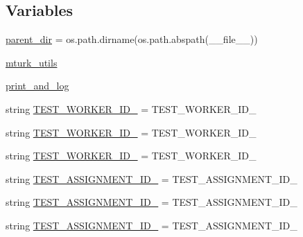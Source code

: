 \subsection*{Variables}
\begin{DoxyCompactItemize}
\item 
\hyperlink{namespaceparlai_1_1mturk_1_1core_1_1dev_1_1test_1_1test__mturk__manager_acd13432cc030998059ef8a169c9fc0d9}{parent\+\_\+dir} = os.\+path.\+dirname(os.\+path.\+abspath(\+\_\+\+\_\+file\+\_\+\+\_\+))
\item 
\hyperlink{namespaceparlai_1_1mturk_1_1core_1_1dev_1_1test_1_1test__mturk__manager_a83971cb67594cba9218bfcffd9ed69f2}{mturk\+\_\+utils}
\item 
\hyperlink{namespaceparlai_1_1mturk_1_1core_1_1dev_1_1test_1_1test__mturk__manager_a8fe3b38bbc8a32c617e98927800a3f06}{print\+\_\+and\+\_\+log}
\item 
string \hyperlink{namespaceparlai_1_1mturk_1_1core_1_1dev_1_1test_1_1test__mturk__manager_a691df1ad716a5363152b26594780d382}{T\+E\+S\+T\+\_\+\+W\+O\+R\+K\+E\+R\+\_\+\+I\+D\+\_} = \textquotesingle{}T\+E\+S\+T\+\_\+\+W\+O\+R\+K\+E\+R\+\_\+\+I\+D\+\_\textquotesingle{}
\item 
string \hyperlink{namespaceparlai_1_1mturk_1_1core_1_1dev_1_1test_1_1test__mturk__manager_a935e89e9de5861e62740e32485699dc6}{T\+E\+S\+T\+\_\+\+W\+O\+R\+K\+E\+R\+\_\+\+I\+D\+\_} = \textquotesingle{}T\+E\+S\+T\+\_\+\+W\+O\+R\+K\+E\+R\+\_\+\+I\+D\+\_\textquotesingle{}
\item 
string \hyperlink{namespaceparlai_1_1mturk_1_1core_1_1dev_1_1test_1_1test__mturk__manager_a5b52d172671ef0039980b281d73647af}{T\+E\+S\+T\+\_\+\+W\+O\+R\+K\+E\+R\+\_\+\+I\+D\+\_} = \textquotesingle{}T\+E\+S\+T\+\_\+\+W\+O\+R\+K\+E\+R\+\_\+\+I\+D\+\_\textquotesingle{}
\item 
string \hyperlink{namespaceparlai_1_1mturk_1_1core_1_1dev_1_1test_1_1test__mturk__manager_a770963a8b8dbeddf1c52f2f5a79c5294}{T\+E\+S\+T\+\_\+\+A\+S\+S\+I\+G\+N\+M\+E\+N\+T\+\_\+\+I\+D\+\_} = \textquotesingle{}T\+E\+S\+T\+\_\+\+A\+S\+S\+I\+G\+N\+M\+E\+N\+T\+\_\+\+I\+D\+\_\textquotesingle{}
\item 
string \hyperlink{namespaceparlai_1_1mturk_1_1core_1_1dev_1_1test_1_1test__mturk__manager_a41f3a979cb9a77aa5410bd0340f77060}{T\+E\+S\+T\+\_\+\+A\+S\+S\+I\+G\+N\+M\+E\+N\+T\+\_\+\+I\+D\+\_} = \textquotesingle{}T\+E\+S\+T\+\_\+\+A\+S\+S\+I\+G\+N\+M\+E\+N\+T\+\_\+\+I\+D\+\_\textquotesingle{}
\item 
string \hyperlink{namespaceparlai_1_1mturk_1_1core_1_1dev_1_1test_1_1test__mturk__manager_aa7e6cd5f93faad82c8d8b9dcea924fe8}{T\+E\+S\+T\+\_\+\+A\+S\+S\+I\+G\+N\+M\+E\+N\+T\+\_\+\+I\+D\+\_} = \textquotesingle{}T\+E\+S\+T\+\_\+\+A\+S\+S\+I\+G\+N\+M\+E\+N\+T\+\_\+\+I\+D\+\_\textquotesingle{}

\end{DoxyCompactItemize}

